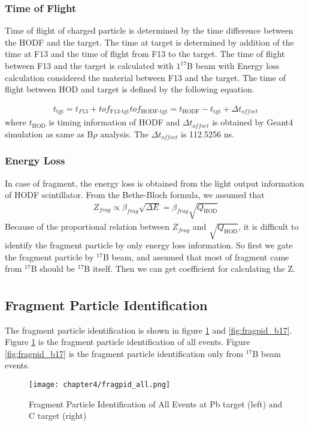 \subsubsection{Time of Flight}
Time of flight of charged particle is determined by the time difference between the HODF and the target. The time at target is determined by addition of the time at F13 and the time of flight from F13 to the target. The time of flight between F13 and the target is calculated with ${}1^{17}$B beam with Energy loss calculation considered the material between F13 and the target. The time of flight between HOD and target is defined by the following equation.

\begin{align}
    t_{\text{tgt}} = t_{F13} + tof_{\text{F13-tgt}}
    tof_{\text{HODF-tgt}} = t_{\text{HODF}} - t_{\text{tgt}} + \Delta t_{offset}
\end{align}
where $t_{\text{HOD}}$ is timing information of HODF and $\Delta t_{offset}$ is obtained by Geant4 simulation as same as B$\rho$ analysis. The $\Delta t_{offset}$ is 112.5256 ns.

\subsubsection{Energy Loss}
In case of fragment, the energy loss is obtained from the light output information of HODF scintillator. From the Bethe-Bloch formula, we assumed that 
\begin{align}
    Z_{frag} \propto \beta_{frag} \sqrt{\Delta E} = \beta_{frag} \sqrt{Q_{\text{HOD}}}
\end{align}
Because of the proportional relation between $Z_{frag}$ and $\sqrt{Q_{\text{HOD}}}$, it is difficult to identify the fragment particle by only energy loss information. So first we gate the fragment particle by ${}^{17}$B beam, and assumed that most of fragment came from ${}^{17}$B should be ${}^{17}$B itself. Then we can get coefficient for calculating the Z.
\begin{align}
\end{align}

\subsection{Fragment Particle Identification}
The fragment particle identification is shown in figure \ref{fig:fragpid_all} and \ref{fig:fragpid_b17}. Figure \ref{fig:fragpid_all} is the fragment particle identification of all events. Figure \ref{fig:fragpid_b17} is the fragment particle identification only from ${}^{17}$B beam events.
\begin{figure}
    \centering
    \texttt{[image: chapter4/fragpid\_all.png]}
    \caption[Fragment Particle Identification from All Secondary Beam]{Fragment Particle Identification of All Events at Pb target (left) and C target (right)}
    \label{fig:fragpid_all}
\end{figure}

